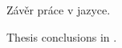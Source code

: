 \documentclass[
  biblatex,
  figures=false,
  glossaries,
  index
]{kidiplom}
\begin{document}
\begin{kiconclusions}
Závěr práce v  jazyce.
\end{kiconclusions}

\begin{kiconclusions}[english]
Thesis conclusions in .
\end{kiconclusions}



\printglossary


\nocite{*}
\printbibliography

%
%

\printindex

\listoffigures

\listoftables
\end{document}

